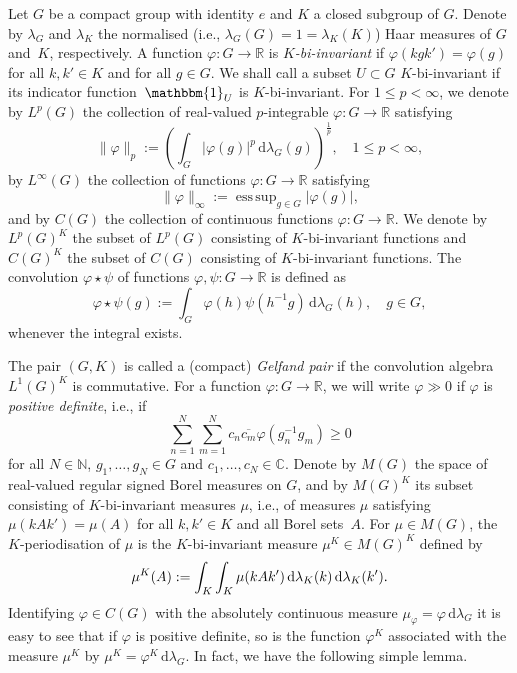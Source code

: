 \documentclass[[a4paper,english,12pt]{amsart}
\theoremstyle{plain}
\theoremstyle{remark}
\newcommand{\ff}{\varphi}
\newcommand{\RR}{\mathbb R}
\newcommand{\NN}{\mathbb N}
\newcommand{\CC}{\mathbb C}
\DeclareMathOperator*{\esssup}{ess\,sup}
\begin{document}
Let $G$ be a compact group with identity \(e\) and $K$ a closed subgroup of $G$. Denote by $\lambda_{G}$ and $\lambda_K$ the normalised (i.e., $\lambda_{G}(G)=1=\lambda_{K}(K)$) Haar measures of $G$ and~$K$, respectively. A function $\ff: G \to \mathbb{R}$ is \emph{$K$-bi-invariant} if $\ff(kgk') = \ff(g)$ for all $k, k' \in  K$ and for all $g \in G$. We shall call a subset $U \subset G$ $K$-bi-invariant if its indicator function~$\mathbbm{1}_{U}$ is $K$-bi-invariant. For $1 \le p < \infty$, we denote by $L^{p}(G)$ the collection of real-valued $p$-integrable $\ff: G \to \mathbb{R}$ satisfying
\begin{equation*}
    \|\ff\|_{p}:= \left(\int_G|\ff(g)|^p \,\mbox{d}\lambda_G(g) \right)^\frac{1}{p}, \quad 1 \le p < \infty,
\end{equation*}
by $L^{\infty}(G)$ the collection of functions $\ff: G \to \mathbb{R}$ satisfying
\begin{equation*}
    \|\ff\|_\infty:= \esssup_{g \in G}|\ff(g)|,
\end{equation*}
and by $C(G)$ the collection of continuous functions $\ff: G \to \mathbb{R}$.
We denote by $L^{p}(G)^K$ the subset of $L^p(G)$ consisting of $K$-bi-invariant functions and $C(G)^{K}$ the subset of $C(G)$  consisting of $K$-bi-invariant functions. The convolution $\ff \star \psi$ of functions $\ff, \psi: G \to \mathbb{R}$ is defined as
\begin{equation*}
\ff \star \psi (g) := \int_{G} \ff(h) \psi(h^{-1}g) \,\mbox{d}\lambda_{G}(h), \quad g \in G,
\end{equation*}
whenever the integral exists.

The pair $(G,K)$ is called a (compact) \emph{Gelfand pair} if the convolution algebra $L^1(G)^{K}$ is commutative. For a function $\ff : G \to \RR$, we will write $\ff \gg 0$ if $\ff$ is \emph{positive definite}, i.e., if
\begin{equation*}\label{posdefdef}
\sum_{n=1}^{N} \sum_{m=1}^N c_n \overline{c_m} \ff(g_n^{-1}g_m) \ge 0
\end{equation*}
for all $N \in \NN$, $g_1, \ldots, g_N \in G$ and $c_1,\ldots, c_N \in \CC$. Denote by $M(G)$ the space of real-valued regular signed Borel measures on $G$, and by $M(G)^K$ its subset consisting of $K$-bi-invariant measures $\mu$, i.e., of measures $\mu$ satisfying $\mu(kAk')=\mu(A)$ for all $k, k' \in K$ and all Borel sets~$A$. For $\mu \in M(G)$, the $K$-periodisation of $\mu$ is the $K$-bi-invariant measure $\mu^K \in M(G)^{K}$ defined by
\begin{equation*}\label{Kaverage}
    \mu^{K}(A) := \int_{K}\int_{K}\mu(kAk') \,\textup{d}\lambda_{K}(k) \,\textup{d}\lambda_{K}(k').
\end{equation*}
Identifying $\ff \in C(G)$ with the absolutely continuous measure $\mu_{\ff} = \ff \,\mbox{d}\lambda_{G}$ it is easy to see that if $\ff$ is positive definite, so is the function $\ff^K$ associated with the measure $\mu^K$ by $\mu^K = \ff^K \,\mbox{d}\lambda_G$. In fact, we have the following simple lemma.
\end{document}
